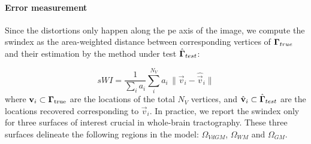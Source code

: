 \paragraph*{Error measurement}\label{sec:experiments_evaluation}
Since the distortions only happen along the \gls*{pe} axis of the image, we compute the
  \gls*{swindex} as the area-weighted distance between corresponding vertices of 
  $\boldsymbol{\Gamma}_{true}$ and their estimation by the method under test $\hat{\boldsymbol{\Gamma}}_{test}$:

  \begin{equation}
  sWI = \frac{1}{\sum_i a_i} \sum\limits_i^{N_V} a_i\,\|
  \vec{v}_i - \hat{\vec{v}}_i \|
  \label{eq:swindex}
  \end{equation}
%
  where $\mathbf{v}_i \subset \boldsymbol{\Gamma}_\text{true}$ are the locations of the total $N_V$ vertices,
  and $\hat{\mathbf{v}}_i \subset \hat{\boldsymbol{\Gamma}}_{test}$ are the locations
  recovered corresponding to $\vec{v}_i$.
In practice, we report the \gls*{swindex} only for three surfaces of interest crucial in whole-brain
  tractography.
These three surfaces delineate the following regions in the model: $\Omega_{VdGM}$, $\Omega_{WM}$ and $\Omega_{GM}$.